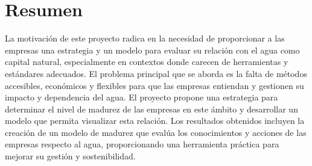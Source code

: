 \section{Resumen}
La motivación de este proyecto radica en la necesidad de proporcionar a las empresas una estrategia y un modelo para evaluar su relación con el agua como capital natural, especialmente en contextos donde carecen de herramientas y estándares adecuados. El problema principal que se aborda es la falta de métodos accesibles, económicos y flexibles para que las empresas entiendan y gestionen su impacto y dependencia del agua. El proyecto propone una estrategia para determinar el nivel de madurez de las empresas en este ámbito y desarrollar un modelo que permita visualizar esta relación. Los resultados obtenidos incluyen la creación de un modelo de madurez que evalúa los conocimientos y acciones de las empresas respecto al agua, proporcionando una herramienta práctica para mejorar su gestión y sostenibilidad.